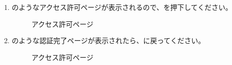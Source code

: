 \begin{enumerate}
                \newpage
                \item {}のようなアクセス許可ページが表示されるので、を押下してください。
                    \begin{figure}[htbp]
                        \centering
                        \caption{アクセス許可ページ}
                        \label{img:misskey5}
                    \end{figure}

                \newpage
                \item {}のような認証完了ページが表示されたら、\bj に戻ってください。
                    \begin{figure}[htbp]
                        \centering
                        \caption{アクセス許可ページ}
                        \label{img:misskey6}
                    \end{figure}


\end{enumerate}
